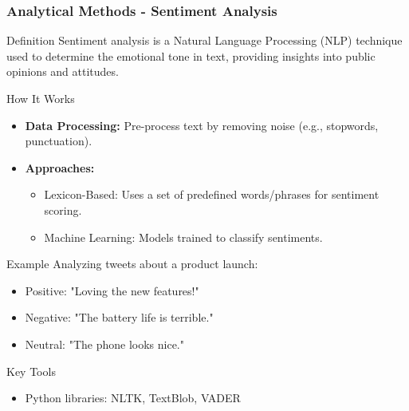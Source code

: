\documentclass{beamer}
\begin{document}
\begin{frame}[fragile]
    \frametitle{Analytical Methods - Sentiment Analysis}
    \begin{block}{Definition}
        Sentiment analysis is a Natural Language Processing (NLP) technique used to determine the emotional tone in text, providing insights into public opinions and attitudes.
    \end{block}
    \begin{block}{How It Works}
        \begin{itemize}
            \item \textbf{Data Processing:} Pre-process text by removing noise (e.g., stopwords, punctuation).
            \item \textbf{Approaches:} 
                \begin{itemize}
                    \item Lexicon-Based: Uses a set of predefined words/phrases for sentiment scoring.
                    \item Machine Learning: Models trained to classify sentiments.
                \end{itemize}
        \end{itemize}
    \end{block}
    \begin{block}{Example}
        Analyzing tweets about a product launch:
        \begin{itemize}
            \item Positive: "Loving the new features!"
            \item Negative: "The battery life is terrible."
            \item Neutral: "The phone looks nice."
        \end{itemize}
    \end{block}
    \begin{block}{Key Tools}
        \begin{itemize}
            \item Python libraries: NLTK, TextBlob, VADER
        \end{itemize}
    \end{block}
\end{frame}
\end{document}
